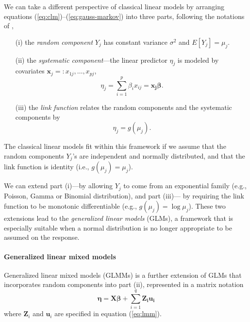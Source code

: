 We can take a different perspective of classical linear models by arranging equations
(\ref{eq:clm})--(\ref{eq:gauss-markov}) into three parts, following the notations of \citet[Chapter
2]{mccullagh1989generalized}, 
\begin{enumerate}
	\item[(i)] the \textit{random component} $Y_j$ has constant variance $\sigma^2$ and
	$E[ Y_j]= \mu_j$.
	\item[(ii)] the \textit{systematic component}---the linear predictor $\eta_j$ is modeled by
	covariates $\bm x_j =: x_{1j},\ldots, x_{pj}$, 
	\begin{equation}\label{eq:part2}
		\eta_j = \sum_{i=1}^p\beta_i x_{ij}=\bm {x_j\beta}.
	\end{equation}
	\item[(iii)] the \textit{link function} relates the random components and the systematic
	components by 
	\begin{equation}\label{eq:part3}
		\eta_j = g(\mu_j).
	\end{equation}
\end{enumerate}
The classical linear models fit within this framework if we assume that the random components 
$Y_j$'s are independent and normally distributed, and that the link function is identity (i.e., 
$g(\mu_j)= \mu_j$).

We can extend part (i)---by allowing $Y_j$ to come from an exponential family (e.g., Poisson,
Gamma or Binomial distribution), and part (iii)--- by requiring the link function to be monotonic
differentiable (e.g., $g(\mu_j)= \log \mu_j$). These two extensions lead to the
\textit{generalized linear models} (GLMs), a framework that is especially suitable when a normal 
distribution is no longer appropriate to be assumed on the response. 

\paragraph{Generalized linear mixed models}\label{para:glmm}
Generalized linear mixed models (GLMMs) is a further extension of GLMs that incorporates random
components into part (ii), represented in a matrix notation
\begin{equation}\label{eq:q5}
	\bm \eta = \bm {X\beta} + \sum_{i=1}^q\bm {Z_iu_i}
\end{equation}
where  $\bm Z_i$ and $\bm u_i$ are specified in equation (\ref{eq:lmm}). 

